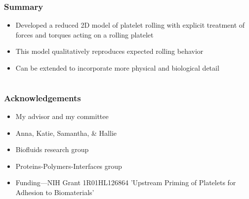 \documentclass{beamer}
\begin{document}
\begin{frame}
  \frametitle{Summary}
  \begin{itemize}
  \item Developed a reduced 2D model of platelet rolling with explicit
    treatment of forces and torques acting on a rolling platelet
    \vfill
  \item This model qualitatively reproduces expected rolling behavior
    \vfill
  \item Can be extended to incorporate more physical and biological detail
  \end{itemize}
\end{frame}
%     


\section{}
\begin{frame}
  \frametitle{Acknowledgements}
  \begin{itemize}
  \item My advisor and my committee
  \item Anna, Katie, Samantha, \& Hallie
  \item Biofluids research group
  \item Proteins-Polymers-Interfaces group
  \item Funding---NIH Grant 1R01HL126864 'Upstream Priming of
    Platelets for Adhesion to Biomaterials'
  \end{itemize}
\end{frame}
\end{document}
